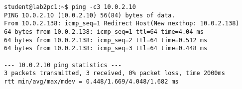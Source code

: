 \begin{lstlisting}
student@lab2pc1:~$ ping -c3 10.0.2.10
PING 10.0.2.10 (10.0.2.10) 56(84) bytes of data.
From 10.0.2.138: icmp_seq=1 Redirect Host(New nexthop: 10.0.2.138)
64 bytes from 10.0.2.138: icmp_seq=1 ttl=64 time=4.04 ms
64 bytes from 10.0.2.138: icmp_seq=2 ttl=64 time=0.512 ms
64 bytes from 10.0.2.138: icmp_seq=3 ttl=64 time=0.448 ms

--- 10.0.2.10 ping statistics ---
3 packets transmitted, 3 received, 0% packet loss, time 2000ms
rtt min/avg/max/mdev = 0.448/1.669/4.048/1.682 ms
\end{lstlisting}
